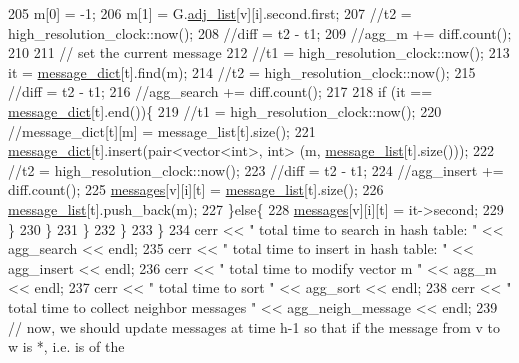 \begin{DoxyCode}
205           m[0] = -1;
206           m[1] = G.\hyperlink{classmarked__graph_a1a0bf7ca413a278763f7c878b3b6fd6f}{adj\_list}[v][i].second.first;
207           \textcolor{comment}{//t2 = high\_resolution\_clock::now();}
208           \textcolor{comment}{//diff = t2 - t1;}
209           \textcolor{comment}{//agg\_m += diff.count();}
210 
211           \textcolor{comment}{// set the current message}
212           \textcolor{comment}{//t1 = high\_resolution\_clock::now();}
213           it = \hyperlink{classgraph__message_ab54d89b122c2b1322da0d5db2043fb84}{message\_dict}[t].find(m);
214           \textcolor{comment}{//t2 = high\_resolution\_clock::now();}
215           \textcolor{comment}{//diff = t2 - t1;}
216           \textcolor{comment}{//agg\_search += diff.count();}
217 
218           \textcolor{keywordflow}{if} (it == \hyperlink{classgraph__message_ab54d89b122c2b1322da0d5db2043fb84}{message\_dict}[t].end())\{
219             \textcolor{comment}{//t1 = high\_resolution\_clock::now();}
220             \textcolor{comment}{//message\_dict[t][m] = message\_list[t].size();}
221             \hyperlink{classgraph__message_ab54d89b122c2b1322da0d5db2043fb84}{message\_dict}[t].insert(pair<vector<int>, \textcolor{keywordtype}{int}> (m, 
      \hyperlink{classgraph__message_aa17fdb629b423343edfafa97252763ef}{message\_list}[t].size()));
222             \textcolor{comment}{//t2 = high\_resolution\_clock::now();}
223             \textcolor{comment}{//diff = t2 - t1;}
224             \textcolor{comment}{//agg\_insert += diff.count();}
225             \hyperlink{classgraph__message_aac77e098f0acf9650116a8e51fe3b4b7}{messages}[v][i][t] = \hyperlink{classgraph__message_aa17fdb629b423343edfafa97252763ef}{message\_list}[t].size();
226             \hyperlink{classgraph__message_aa17fdb629b423343edfafa97252763ef}{message\_list}[t].push\_back(m);
227           \}\textcolor{keywordflow}{else}\{
228             \hyperlink{classgraph__message_aac77e098f0acf9650116a8e51fe3b4b7}{messages}[v][i][t] = it->second;
229           \}
230         \}
231       \}
232     \}
233   \}
234   cerr << \textcolor{stringliteral}{" total time to search in hash table: "} << agg\_search << endl;
235   cerr << \textcolor{stringliteral}{" total time to insert in hash table: "} << agg\_insert << endl;
236   cerr << \textcolor{stringliteral}{" total time to modify vector m  "} << agg\_m << endl;
237   cerr << \textcolor{stringliteral}{" total time to sort  "} << agg\_sort << endl;
238   cerr << \textcolor{stringliteral}{" total time to collect neighbor messages "} <<  agg\_neigh\_message << endl;
239   \textcolor{comment}{// now, we should update messages at time h-1 so that if the message from v to w is *, i.e. is of the
}
\end{DoxyCode}
